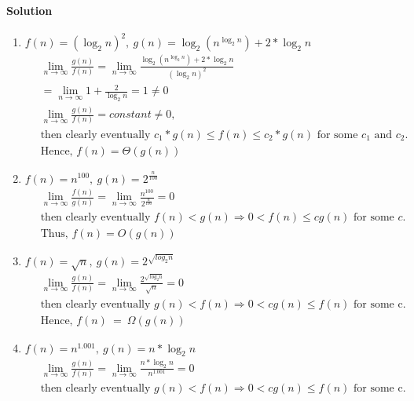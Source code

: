 \documentclass[a4paper]{scrartcl}
\begin{document}
\paragraph{Solution}
\begin{enumerate}[label=(\alph*)]
  \item $f(n)=\left(\log_2n\right)^2,\ g(n)=\log_2\left(n^{\log_2{n}}\right) + 2*\log_2{n}$
  \begin{align*}
  &\ \lim_{n\to\infty} \frac{g(n)}{f(n)}= \lim_{n\to\infty} \frac{\log_2\left(n^{\log_2{n}}\right) + 2*\log_2{n}}{\left(\log_2n\right)^2}\\
  &\ =\lim_{n\to\infty} 1+\frac{2}{\log_2{n}}=1\neq0\\
  &\ \lim_{n\to\infty}\frac{g(n)}{f(n)}=constant\neq0,\\ &\
  \text{then clearly eventually }c_1*g(n)\leq f(n) \leq c_2*g(n)\text{ for some }c_1\text{ and }c_2.\\ &\
  \text{Hence, }f(n)=\Theta(g(n))
  \end{align*}
  \item $f(n)= n^{100},\ g(n)=2^{\frac{n}{100}}$
  \begin{align*}
   &\ \lim_{n\to\infty} \frac{f(n)}{g(n)}=\lim_{n\to\infty} \frac{n^{100}}{2^{\frac{n}{100}}}=0\\ &\
  \text{then clearly eventually }f(n)<g(n) \Rightarrow 0<f(n)\leq cg(n)\text{ for some }c.\\ &\
  \text{Thus, }f(n)=O(g(n))
  \end{align*}
  \item $f(n)=\sqrt{n},\ g(n)=2^{\sqrt{log_2 n}}$
  \begin{align*}
    &\ \lim_{n\to\infty} \frac{g(n)}{f(n)}=\lim_{n\to\infty} \frac{2^{\sqrt{log_2 n}}}{\sqrt{n}}=0\\ &\
    \text{then clearly eventually }g(n)<f(n)\Rightarrow 0<cg(n)\leq f(n)\text{ for some c}.\\ &\ 
    \text{Hence, }f(n)\ =\ \Omega(g(n))
  \end{align*}
  \item $f(n)=n^{1.001},\ g(n)=n*\log_2{n}$
  \begin{align*}
    &\ \lim_{n\to\infty} \frac{g(n)}{f(n)}=\lim_{n\to\infty} \frac{n*\log_2{n}}{n^{1.001}}=0\\ &\
    \text{then clearly eventually }g(n)<f(n)\Rightarrow 0<cg(n)\leq f(n)\text{ for some c}.\\ &\

\end{align*}
\end{enumerate}
\end{document}
